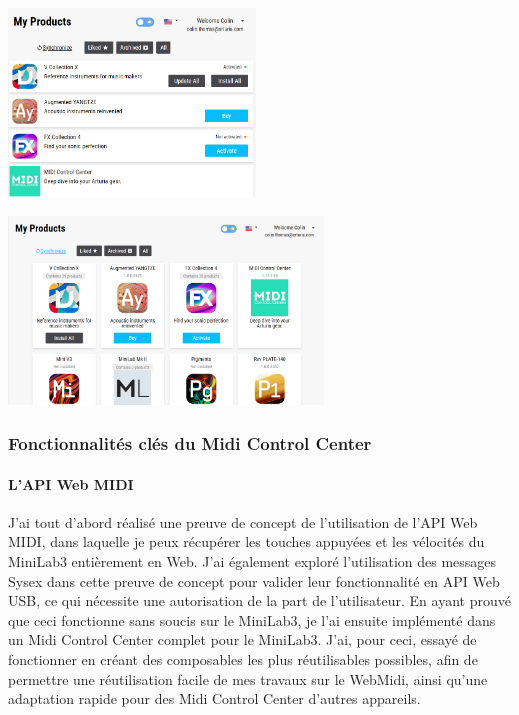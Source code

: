 \documentclass[francais]{rapportPFE}  %
\begin{document}
\begin{center}
    \centering
    \begin{minipage}{.5\textwidth}
    \centering
    \includegraphics[height=5cm]{graphics/small.png}
    \label{fig:test1}
    \end{minipage}%
    \begin{minipage}{.5\textwidth}
    \centering
    \includegraphics[height=5cm]{graphics/big.png}
    \label{fig:test2}
    \end{minipage}
    \end{center}


\subsubsection{Fonctionnalités clés du Midi Control Center}

\paragraph{L'API Web MIDI}
J'ai tout d'abord réalisé une preuve de concept de l'utilisation de l'API Web MIDI, dans laquelle je peux récupérer les touches appuyées et les vélocités du MiniLab3 entièrement en Web. J'ai également exploré l'utilisation des messages Sysex dans cette preuve de concept pour valider leur fonctionnalité en API Web USB, ce qui nécessite une autorisation de la part de l'utilisateur.
En ayant prouvé que ceci fonctionne sans soucis sur le MiniLab3, je l'ai ensuite implémenté dans un Midi Control Center complet pour le MiniLab3. J'ai, pour ceci, essayé de fonctionner en créant des composables les plus réutilisables possibles, afin de permettre une réutilisation facile de mes travaux sur le WebMidi, ainsi qu'une adaptation rapide pour des Midi Control Center d'autres appareils.
\end{document}

